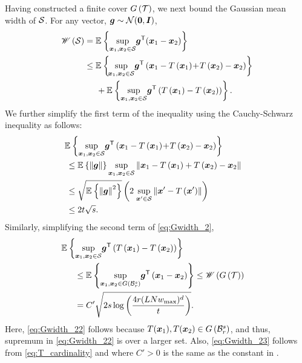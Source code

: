 \documentclass[journal]{IEEEtran}
\newcommand{\wid}{\mathscr{W}}
\begin{document}
Having constructed a finite cover $G\left(\mathcal{T}\right)$,  we next bound the Gaussian mean width of $\mathcal{S}$. For any vector, $\boldsymbol{g}\sim\mathcal{N}(\boldsymbol{0},\boldsymbol{I})$,
\begin{align}
 \wid\lb \calS\rb &= \expect{}{\underset{\vecx_1,\vecx_2\in\calS}{\sup}\vecg\tran(\vecx_1-\vecx_2)}\\
&\leq \expect{}{\!\underset{\vecx_1,\vecx_2\in\calS}{\sup}\vecg\tran\lb\vecx_1-T\lb\vecx_1\rb\!+\!T\lb\vecx_2\rb-\vecx_2\rb}\notag\\
& \hspace{0.5cm}+\expect{}{\underset{\vecx_1,\vecx_2\in\calS}{\sup}\vecg\tran\lb T\lb\vecx_1\rb-T\lb\vecx_2\rb\rb}\label{eq:Gwidth_2}.
\end{align}
We further simplify the first term of the inequality using the Cauchy-Schwarz inequality as follows:
\begin{align}
\expect{}{\underset{\vecx_1,\vecx_2\in\calS}{\sup}\vecg\tran\lb\vecx_1-T\lb\vecx_1\rb\!+\!T\lb\vecx_2\rb-\vecx_2\rb}\notag\\
&\hspace{-6.5cm}\leq \expect{}{\lV\vecg\rV}\underset{\vecx_1,\vecx_2\in\calS}{\sup}\lV \vecx_1-T\lb\vecx_1\rb+T\lb\vecx_2\rb-\vecx_2\rV\label{eq:Gwidth_11}\\
&\hspace{-6.5cm}\leq \sqrt{\expect{}{\lV\vecg\rV^2}}\lb 2\;\underset{\vecx'\in\calS}{\sup}\lV \vecx'-T\lb\vecx'\rb\rV\rb\\
&\hspace{-6.5cm}\leq2t\sqrt{s}.\label{eq:Gwidth_12}
\end{align}
Similarly, simplifying the second term of \eqref{eq:Gwidth_2},
\begin{align}
\expect{}{\underset{\vecx_1,\vecx_2\in\calS}{\sup}\vecg\tran\lb T\lb\vecx_1\rb-T\lb\vecx_2\rb\rb}\notag\\
&\hspace{-4.5cm} \leq \expect{}{\underset{\vecx_1,\vecx_2\in G\lb\calB^s_r\rb}{\sup}\vecg\tran\lb \vecx_1-\vecx_2\rb}\leq \wid \lb G\lb\calT\rb\rb\label{eq:Gwidth_22}\\
&\hspace{-4.5cm}= C'\sqrt{2s\log \lb\frac{4r(LNw_{\max})^d}{t}\rb}.\label{eq:Gwidth_23}
\end{align}
Here, \eqref{eq:Gwidth_22} follows because $T(\boldsymbol{x}_1),T(\boldsymbol{x}_2)\in G\left(\mathcal{B}^s_r\right)$, and thus, supremum in \eqref{eq:Gwidth_22} is over a larger set. Also, \eqref{eq:Gwidth_23} follows from \eqref{eq:T_cardinality} and  where $C'>0$ is the same as the constant in . 
\end{document}
